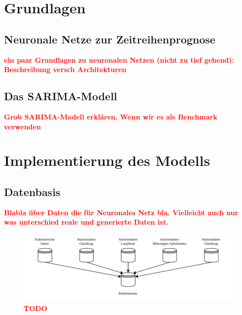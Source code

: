 \documentclass[
12pt, %
toc=listofnumbered, %
toc=chapterentrydotfill, %
numbers=noenddot, %
captions=tableheading, %
]{scrreprt}
\let\Oldsection\section
\renewcommand{\section}{\FloatBarrier\Oldsection}
\newcommand{\highlight}[1]{\textbf{\textcolor{red}{#1}}}
\begin{document}
\chapter{Grundlagen}

\section{Neuronale Netze zur Zeitreihenprognose}
\highlight{ein paar Grundlagen zu neuronalen Netzen (nicht zu tief gehend): 
Beschreibung versch Architekturen}

\section{Das SARIMA-Modell}
\highlight{Grob SARIMA-Modell erklären. Wenn wir es als Benchmark verwenden}


\chapter{Implementierung des Modells}

\section{Datenbasis}
\highlight{Blabla über Daten die für Neuronales Netz bla. Vielleicht auch nur was unterschied reale und generierte Daten ist.}

\begin{figure}[tph]
	\begin{center}
		\includegraphics[]{./images/rohdatensatz.pdf}
		\caption{\highlight{{TODO}}}
		\label{fig:rohdatensatz}
	\end{center}
\end{figure}
\end{document}
